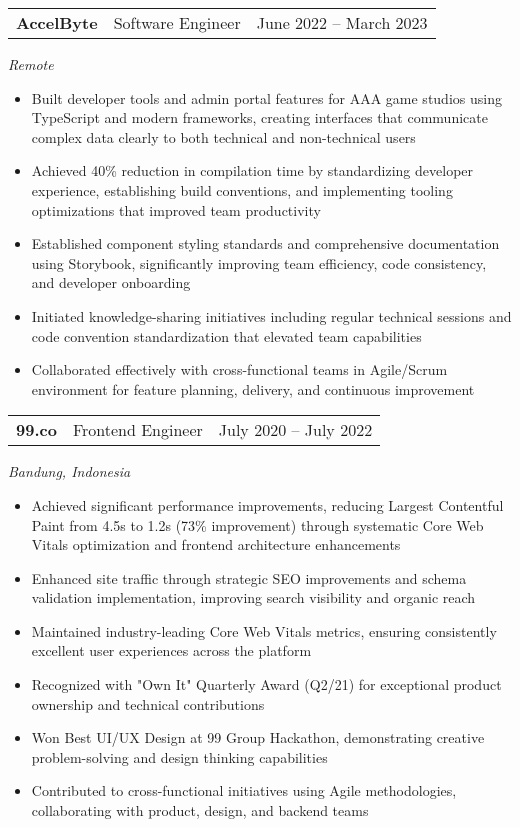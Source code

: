 \documentclass[a4paper, 11pt]{article}
\newcommand{\resumeItem}[1]{
  \item\small{
    {#1 \vspace{-2pt}}
  }
}
\newcommand{\resumeSubheading}[4]{
  \vspace{-2pt}\item
    \begin{tabularx}{0.987\textwidth}[t]{
  >{\raggedright\arraybackslash}X
  >{\centering\arraybackslash}X
  >{\raggedleft\arraybackslash}X }
      \textbf{#1} & #2 & #3 \\
    \end{tabularx}
    \textit{\small#4}\\
    \vspace{-7pt}
}
\newcommand{\resumeItemListStart}{\begin{itemize}[leftmargin=0.22in]}
\newcommand{\resumeItemListEnd}{\end{itemize}\vspace{-20pt}}
\begin{document}
        \resumeSubheading
            {AccelByte}{Software Engineer}{June 2022 -- March 2023}
            {Remote}
            \resumeItemListStart
                \resumeItem{Built developer tools and admin portal features for AAA game studios using TypeScript and modern frameworks, creating interfaces that communicate complex data clearly to both technical and non-technical users}
                \resumeItem{Achieved 40\% reduction in compilation time by standardizing developer experience, establishing build conventions, and implementing tooling optimizations that improved team productivity}
                \resumeItem{Established component styling standards and comprehensive documentation using Storybook, significantly improving team efficiency, code consistency, and developer onboarding}
                \resumeItem{Initiated knowledge-sharing initiatives including regular technical sessions and code convention standardization that elevated team capabilities}
                \resumeItem{Collaborated effectively with cross-functional teams in Agile/Scrum environment for feature planning, delivery, and continuous improvement}
            \resumeItemListEnd

        \resumeSubheading
            {99.co}{Frontend Engineer}{July 2020 -- July 2022}
            {Bandung, Indonesia}
            \resumeItemListStart
                \resumeItem{Achieved significant performance improvements, reducing Largest Contentful Paint from 4.5s to 1.2s (73\% improvement) through systematic Core Web Vitals optimization and frontend architecture enhancements}
                \resumeItem{Enhanced site traffic through strategic SEO improvements and schema validation implementation, improving search visibility and organic reach}
                \resumeItem{Maintained industry-leading Core Web Vitals metrics, ensuring consistently excellent user experiences across the platform}
                \resumeItem{Recognized with "Own It" Quarterly Award (Q2/21) for exceptional product ownership and technical contributions}
                \resumeItem{Won Best UI/UX Design at 99 Group Hackathon, demonstrating creative problem-solving and design thinking capabilities}
                \resumeItem{Contributed to cross-functional initiatives using Agile methodologies, collaborating with product, design, and backend teams}
            \resumeItemListEnd
\end{document}
